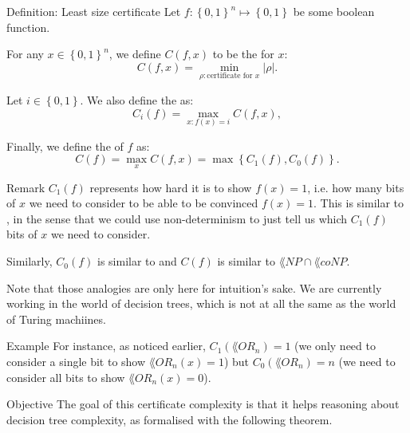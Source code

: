 \documentclass[a4paper]{article}
\begin{document}
\begin{parag}{Definition: Least size certificate}
    Let $f: \left\{0, 1\right\}^n \mapsto \left\{0, 1\right\}$ be some boolean function.

    For any $x \in \left\{0, 1\right\}^n$, we define $C\left(f, x\right)$ to be the  for $x$: 
    \[C\left(f, x\right) = \min_{\rho: \text{certificate for $x$}} \left|\rho\right|.\]
    
    Let $i \in \left\{0, 1\right\}$. We also define the  as: 
    \[C_i\left(f\right) = \max_{x: f\left(x\right) = i} C\left(f,x\right),\] 

    Finally, we define the  of $f$  as:
    \[C\left(f\right) = \max_{x} C\left(f, x\right) = \max \left\{C_1\left(f\right), C_0\left(f\right)\right\}.\]

    \begin{subparag}{Remark}
        $C_1\left(f\right)$ represents how hard it is to show $f\left(x\right) = 1$, i.e. how many bits of $x$ we need to consider to be able to be convinced $f\left(x\right) = 1$. This is similar to , in the sense that we could use non-determinism to just tell us which $C_1\left(f\right)$ bits of $x$ we need to consider.

        Similarly, $C_0\left(f\right)$ is similar to  and $C\left(f\right)$ is similar to $\lang{NP} \cap \lang{coNP}$.

        Note that those analogies are only here for intuition's sake. We are currently working in the world of decision trees, which is not at all the same as the world of Turing machiines.
    \end{subparag}

    \begin{subparag}{Example}
        For instance, as noticed earlier, $C_1\left(\lang{OR}_n\right) = 1$ (we only need to consider a single bit to show $\lang{OR}_n\left(x\right) = 1$) but $C_0\left(\lang{OR}_n\right) = n$ (we need to consider all bits to show $\lang{OR}_n\left(x\right) = 0$).
    \end{subparag}

    \begin{subparag}{Objective}
        The goal of this certificate complexity is that it helps reasoning about decision tree complexity, as formalised with the following theorem.
    \end{subparag}
\end{parag}
\end{document}
